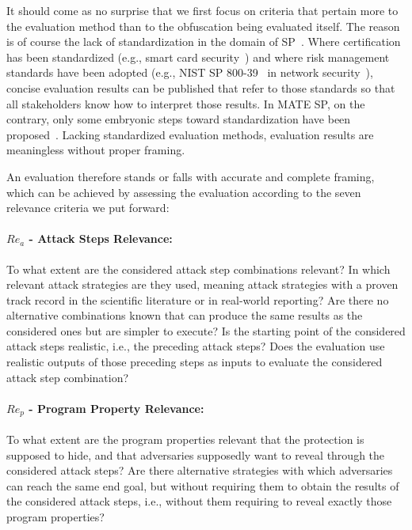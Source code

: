 It should come as no surprise that we first focus on criteria that pertain more to the evaluation method than to the obfuscation being evaluated itself. The reason is of course the lack of standardization in the domain of SP~\cite{Basile23}. Where certification has been standardized (e.g., smart card security~\cite{common_criteria}) and where risk management standards have been adopted (e.g., NIST SP 800-39~\cite{nistSP800-39} in network security~\cite{Gartner-report-riskanalysis}), concise evaluation results can be published that refer to those standards so that all stakeholders know how to interpret those results. In MATE SP, on the contrary, only some embryonic steps toward standardization have been proposed~\cite{Basile23}. Lacking standardized evaluation methods, evaluation results are meaningless without proper framing. 

An evaluation therefore stands or falls with accurate and complete framing, which can be achieved by assessing the evaluation according to the seven relevance criteria we put forward:

\paragraph{$Re_a$ - Attack Steps Relevance:} To what extent are the considered attack step combinations relevant? In which relevant attack strategies are they used, meaning attack strategies with a proven track record in the scientific literature or in real-world reporting? Are there no alternative combinations known that can produce the same results as the considered ones but are simpler to execute? Is the starting point of the considered attack steps realistic, i.e., the preceding attack steps? Does the evaluation use realistic outputs of those preceding steps as inputs to evaluate the considered attack step combination?

\paragraph{$Re_p$ - Program Property Relevance:} To what extent are the program properties relevant that the protection is supposed to hide, and that adversaries supposedly want to reveal through the considered attack steps? Are there alternative strategies with which adversaries can reach the same end goal, but without requiring them to obtain the results of the considered attack steps, i.e., without them requiring to reveal exactly those program properties?

